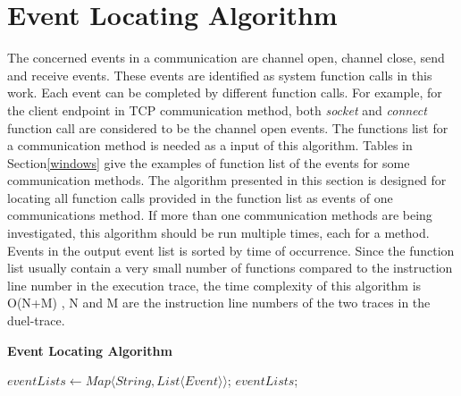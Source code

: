 \section{Event Locating Algorithm}
The concerned events in a communication are channel open, channel close, send and receive events. These events are identified as system function calls in this work. Each event can be completed by different function calls. For example, for the client endpoint in TCP communication method, both  \textit{socket} and \textit{connect} function call are considered to be the channel open events. The functions list for a communication method is needed as a input of this algorithm. Tables in Section\ref{windows} give the examples of function list of the events for some communication methods. The algorithm presented in this section is designed for locating all function calls provided in the function list as events of one communications method. If more than one communication methods are being investigated, this algorithm should be run multiple times, each for a method. Events in the output event list is sorted by time of occurrence. Since the function list usually contain a very small number of functions compared to the instruction line number in the execution trace, the time complexity of this algorithm is O(N+M) , N and M are the instruction line numbers of the two traces in the duel-trace.

\begin{algorithm}[H]
\DontPrintSemicolon
\caption{{\bf Event Locating Algorithm} \label{eventLocAlg}}
$eventLists \leftarrow Map \langle String, List \langle Event\rangle \rangle$;\; 
\KwRet $eventLists$;\;
\end{algorithm} 


